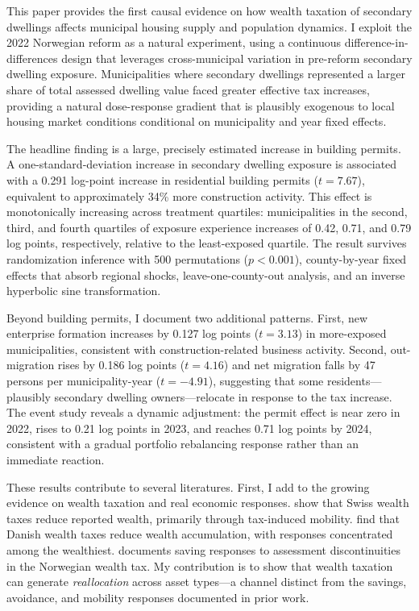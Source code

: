 \documentclass[12pt]{article}
\begin{document}
This paper provides the first causal evidence on how wealth taxation of secondary dwellings affects municipal housing supply and population dynamics. I exploit the 2022 Norwegian reform as a natural experiment, using a continuous difference-in-differences design that leverages cross-municipal variation in pre-reform secondary dwelling exposure. Municipalities where secondary dwellings represented a larger share of total assessed dwelling value faced greater effective tax increases, providing a natural dose-response gradient that is plausibly exogenous to local housing market conditions conditional on municipality and year fixed effects.

The headline finding is a large, precisely estimated increase in building permits. A one-standard-deviation increase in secondary dwelling exposure is associated with a 0.291 log-point increase in residential building permits ($t = 7.67$), equivalent to approximately 34\% more construction activity. This effect is monotonically increasing across treatment quartiles: municipalities in the second, third, and fourth quartiles of exposure experience increases of 0.42, 0.71, and 0.79 log points, respectively, relative to the least-exposed quartile. The result survives randomization inference with 500 permutations ($p < 0.001$), county-by-year fixed effects that absorb regional shocks, leave-one-county-out analysis, and an inverse hyperbolic sine transformation.

Beyond building permits, I document two additional patterns. First, new enterprise formation increases by 0.127 log points ($t = 3.13$) in more-exposed municipalities, consistent with construction-related business activity. Second, out-migration rises by 0.186 log points ($t = 4.16$) and net migration falls by 47 persons per municipality-year ($t = -4.91$), suggesting that some residents---plausibly secondary dwelling owners---relocate in response to the tax increase. The event study reveals a dynamic adjustment: the permit effect is near zero in 2022, rises to 0.21 log points in 2023, and reaches 0.71 log points by 2024, consistent with a gradual portfolio rebalancing response rather than an immediate reaction.

These results contribute to several literatures. First, I add to the growing evidence on wealth taxation and real economic responses. \citet{brulhart2022taxing} show that Swiss wealth taxes reduce reported wealth, primarily through tax-induced mobility. \citet{jakobsen2020wealth} find that Danish wealth taxes reduce wealth accumulation, with responses concentrated among the wealthiest. \citet{ring2023wealth} documents saving responses to assessment discontinuities in the Norwegian wealth tax. My contribution is to show that wealth taxation can generate \textit{reallocation} across asset types---a channel distinct from the savings, avoidance, and mobility responses documented in prior work.
\end{document}
